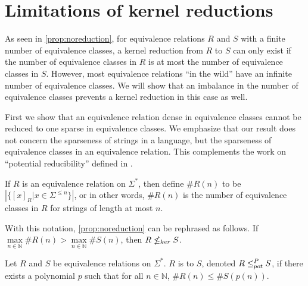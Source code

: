 \section{Limitations of kernel reductions}
As seen in \autoref{prop:noreduction}, for equivalence relations $R$ and $S$ with a finite number of equivalence classes, a kernel reduction from $R$ to $S$ can only exist if the number of equivalence classes in $R$ is at most the number of equivalence classes in $S$.
However, most equivalence relations ``in the wild'' have an infinite number of equivalence classes.
We will show that an imbalance in the number of equivalence classes prevents a kernel reduction in this case as well.

First we show that an equivalence relation dense in equivalence classes cannot be reduced to one sparse in equivalence classes.
We emphasize that our result does not concern the sparseness of strings in a language, but the sparseness of equivalence classes in an equivalence relation.
This complements the work on ``potential reducibility'' defined in \autocite[Section~5]{bcffm}.

\begin{definition}%
  If $R$ is an equivalence relation on $\Sigma^*$, then define $\#R(n)$ to be $\left|\{[x]_R | x \in \Sigma^{\leq n}\}\right|$, or in other words, $\#R(n)$ is the number of equivalence classes in $R$ for strings of length at most $n$.
\end{definition}

\begin{example}
  With this notation, \autoref{prop:noreduction} can be rephrased as follows.
  If $\max\limits_{n \in \mathbb{N}} \#R(n) > \max\limits_{n \in \mathbb{N}} \#S(n)$, then $R \nleq_{ker} S$.
\end{example}

\begin{definition}
  Let $R$ and $S$ be equivalence relations on $\Sigma^*$.
  $R$ is  to $S$, denoted $R\leq^{P}_{pot} S$, if there exists a polynomial $p$ such that for all $n\in\mathbb{N}$, $\#R(n)\leq \#S(p(n))$.
\end{definition}

